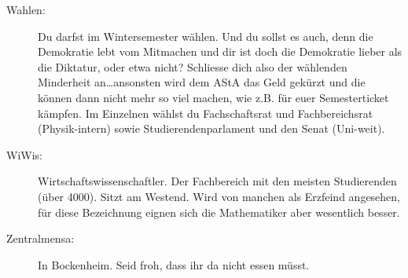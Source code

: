 \begin{description}
    \item[Wahlen:]Du darfst im Wintersemester wählen.
    Und du sollst es auch, denn die
Demokratie lebt vom Mitmachen und dir ist doch die Demokratie
lieber als die Diktatur, oder etwa nicht? Schliesse dich also der
wählenden Minderheit an\ldots ansonsten wird dem AStA das Geld
gekürzt und die können dann nicht mehr so viel machen, wie z.B.
für euer Semesterticket kämpfen.
Im Einzelnen wählst du
Fachschaftsrat und Fachbereichsrat (Physik-intern) sowie
Studierendenparlament und den Senat (Uni-weit).

    \item[WiWis:]Wirtschaftswissenschaftler.
    Der Fachbereich mit den meisten Studierenden (über 4000).
 Sitzt am Westend.
 Wird von manchen als Erzfeind angesehen, für diese
Bezeichnung eignen sich die Mathematiker aber wesentlich besser.

\item[Zentralmensa:]In Bockenheim.
Seid froh, dass ihr da nicht essen müsst.


\end{description}
%
